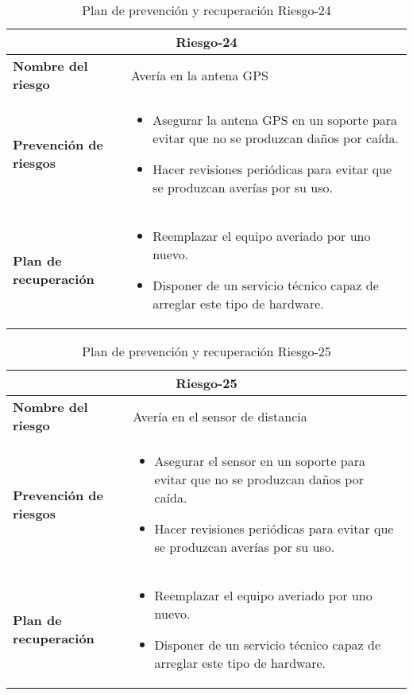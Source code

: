 \begin{table}[H]
\begin{center}
\begin{tabular}{p{} p{10cm}}
\multicolumn{2}{c}{\textbf{Riesgo-24} } \\
\hline \hline
\textbf{Nombre del riesgo} & Avería en la antena GPS \\
\hline
\textbf{Prevención de riesgos} & \begin{itemize}[-]
  \item Asegurar la antena GPS en un soporte para evitar que no se produzcan daños por caída.
  \item Hacer revisiones periódicas para evitar que se produzcan averías por su uso.
  \end{itemize} \\
\hline
\textbf{Plan de recuperación} &   \begin{itemize}[-]
  \item Reemplazar el equipo averiado por uno nuevo.
  \item Disponer de un servicio técnico capaz de arreglar este tipo de hardware.
  \end{itemize}\\
\hline
\end{tabular}
\caption{Plan de prevención y recuperación Riesgo-24}
\label{tab:Riesgo-24-Prev_Recup}
\end{center}
\end{table}

\begin{table}[H]
\begin{center}
\begin{tabular}{p{} p{10cm}}
\multicolumn{2}{c}{\textbf{Riesgo-25} } \\
\hline \hline
\textbf{Nombre del riesgo} & Avería en el sensor de distancia  \\
\hline
\textbf{Prevención de riesgos} & \begin{itemize}[-]
  \item Asegurar el sensor en un soporte para evitar que no se produzcan daños por caída.
  \item Hacer revisiones periódicas para evitar que se produzcan averías por su uso.
  \end{itemize} \\
\hline
\textbf{Plan de recuperación} &   \begin{itemize}[-]
  \item Reemplazar el equipo averiado por uno nuevo.
  \item Disponer de un servicio técnico capaz de arreglar este tipo de hardware.
  \end{itemize}\\
\hline
\end{tabular}
\caption{Plan de prevención y recuperación Riesgo-25}
\label{tab:Riesgo-25-Prev_Recup}
\end{center}
\end{table}

